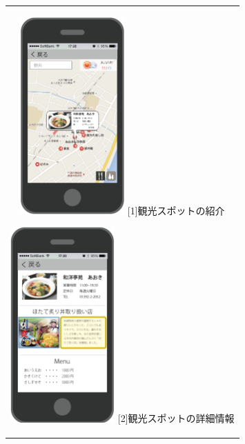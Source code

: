 \documentclass[openany,11pt,papersize]{jsbook}
\begin{document}
\begin{figure}[htbp]
  \begin{center}
    \begin{tabular}{c}

      \begin{minipage}{0.33\hsize}
        \begin{center}
\includegraphics[width=4cm, bb=0 0 303 573]{5.2_map1.png}
          \hspace{1cm} [1]観光スポットの紹介
        \end{center}
      \end{minipage}

      \begin{minipage}{0.33\hsize}
        \begin{center}
\includegraphics[width=4cm, bb=0 0 304 570]{5.2_map2.png}
          \hspace{1cm} [2]観光スポットの詳細情報
        \end{center}
      \end{minipage}


\end{tabular}
\end{center}
\end{figure}
\end{document}
